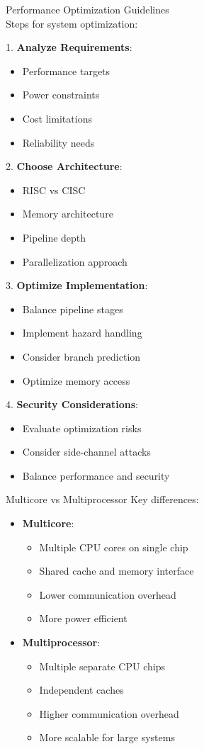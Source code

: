 \begin{KR}{Performance Optimization Guidelines}\\
Steps for system optimization:

1. \textbf{Analyze Requirements}:
\begin{itemize}
  \item Performance targets
  \item Power constraints
  \item Cost limitations
  \item Reliability needs
\end{itemize}

2. \textbf{Choose Architecture}:
\begin{itemize}
  \item RISC vs CISC
  \item Memory architecture
  \item Pipeline depth
  \item Parallelization approach
\end{itemize}

3. \textbf{Optimize Implementation}:
\begin{itemize}
  \item Balance pipeline stages
  \item Implement hazard handling
  \item Consider branch prediction
  \item Optimize memory access
\end{itemize}

4. \textbf{Security Considerations}:
\begin{itemize}
  \item Evaluate optimization risks
  \item Consider side-channel attacks
  \item Balance performance and security
\end{itemize}
\end{KR}

\begin{example2}{Multicore vs Multiprocessor}
Key differences:
\begin{itemize}
  \item \textbf{Multicore}:
    \begin{itemize}
      \item Multiple CPU cores on single chip
      \item Shared cache and memory interface
      \item Lower communication overhead
      \item More power efficient
    \end{itemize}
  \item \textbf{Multiprocessor}:
    \begin{itemize}
      \item Multiple separate CPU chips
      \item Independent caches
      \item Higher communication overhead
      \item More scalable for large systems
    \end{itemize}
\end{itemize}
\end{example2}